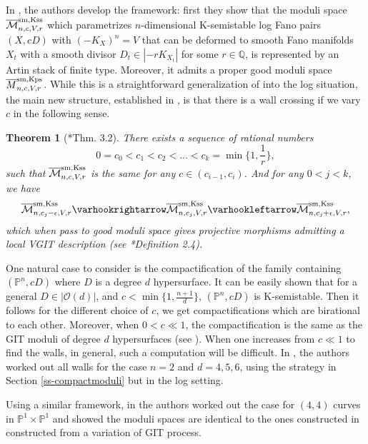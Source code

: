 \documentclass[12pt,reqno]{amsart}%
\newtheorem{thm}{Theorem}[section]
\theoremstyle{definition}
\theoremstyle{remark}
\newcommand{\cM}{{\mathcal{M}}}
\newcommand{\bQ}{{\mathbb{Q}}}
\begin{document}
In \cite{ADL19}, the authors develop the framework: first they show that the moduli space $\overline{\cM}^{\rm sm, Kss}_{n,c,V,r}$ which parametrizes $n$-dimensional K-semistable log Fano pairs $(X,cD)$ with $ (-K_X)^{n}=V$  that can be deformed to smooth Fano manifolds $X_t$ with a smooth divisor $D_t\in |-rK_{X_t}|$ for some $r\in \bQ$, is represented by an Artin stack of finite type. Moreover, it admits a proper good moduli space $\overline{M}^{\rm sm, Kps}_{n,c,V,r}$. While this is a straightforward generalization of \cite{LWX19} into the log situation, the main new structure, established in \cite{ADL19}, is that there is a wall crossing if we vary $c$ in the following sense.
\begin{thm}[{\cite{ADL19}*{Thm. 3.2}}]There exists a sequence of rational numbers 
$$0=c_0<c_1<c_2<...<c_k=\min \{1,\frac{1}{r}\},$$ such that $\overline{\cM}^{\rm sm, Kss}_{n,c,V,r}$ is the same for any $c\in (c_{i-1},c_i)$. And for any $0<j<k$, we have
$$\overline{\cM}^{\rm sm, Kss}_{n,c_j-\epsilon,V,r}\varhookrightarrow \overline{\cM}^{\rm sm, Kss}_{n,c_j,V,r} \varhookleftarrow \overline{\cM}^{\rm sm, Kss}_{n,c_j+\epsilon,V,r},$$
which when pass to good moduli space gives projective morphisms admitting a local VGIT description (see \cite{AFS17}*{Definition 2.4}).
\end{thm}  
One natural case to consider is the compactification of the family containing $(\mathbb P^n, cD)$ where $D$ is a degree $d$ hypersurface. It can be easily shown that for a general $D\in |\mathcal{O}(d)|$, and $c<\min\{1,\frac{n+1}{d}\}$, $(\mathbb{P}^n,cD)$ is K-semistable.  Then it follows for the different choice of $c$, we get  compactifications which are birational to each other.  Moreover, when $0<c\ll 1$, the compactification is the same as the GIT moduli of degree $d$ hypersurfaces (see \cite[Theorem 1.4]{ADL19}). 
When one increases from $c\ll 1$ to find the walls, in general, such a computation will be difficult. In \cite{ADL19}, the authors worked out all walls for the case $n=2$ and $d=4,5,6$, using the strategy in Section \ref{ss-compactmoduli} but in the log setting. 

Using a similar framework,  in \cite{ADL20} the authors worked out the case for $(4,4)$ curves in $\mathbb{P}^1\times \mathbb{P}^1$ and showed the moduli spaces are identical to the ones constructed in \cite{LO18} constructed from a variation of GIT process. 
\end{document}
